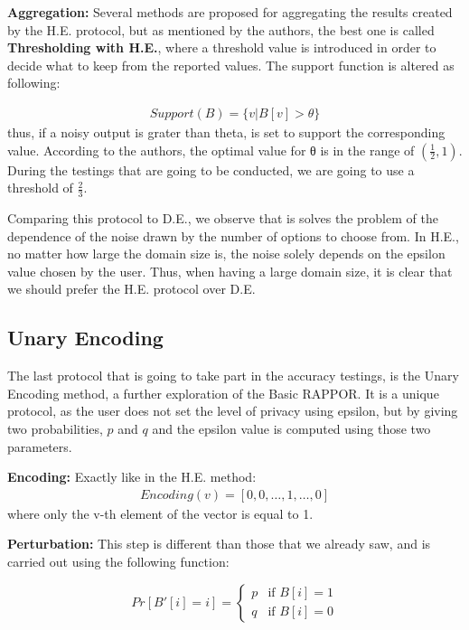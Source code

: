 \textbf{Aggregation:} Several methods are proposed for aggregating the results created by the H.E. protocol, but as mentioned by the authors, the best one is called \textbf{Thresholding with H.E.}, where a threshold value is introduced in order to decide what to keep from the reported values. The support function is altered as following:

\begin{align*}
    Support(B) = \{v | B[v] > \theta\}
\end{align*}
thus, if a noisy output is grater than theta, is set to support the corresponding value. According to the authors, the optimal value for θ is in the range of $(\frac{1}{2}, 1)$. During the testings that are going to be conducted, we are going to use a threshold of $\frac{2}{3}$.


Comparing this protocol to D.E., we observe that is solves the problem of the dependence of the noise drawn by the number of options to choose from. In H.E., no matter how large the domain size is, the noise solely depends on the epsilon value chosen by the user. Thus, when having a large domain size, it is clear that we should prefer the H.E. protocol over D.E.

\subsection{Unary Encoding}

The last protocol that is going to take part in the accuracy testings, is the Unary Encoding method, a further exploration of the Basic RAPPOR. It is a unique protocol, as the user does not set the level of privacy using epsilon, but by giving two probabilities, $p$ and $q$ and the epsilon value is computed using those two parameters.

\textbf{Encoding:} Exactly like in the H.E. method:
\begin{align*}
Encoding(v) = [0, 0, \dots, 1, \dots, 0] 
\end{align*}
where only the v-th element of the vector is equal to 1.

\textbf{Perturbation:} This step is different than those that we already saw, and is carried out using the following function:


\begin{equation*}
    Pr[B'[i] = i] =
	\begin{cases}
    	p  & \mbox{if } B[i] = 1 \\
    	q & \mbox{if } B[i] = 0 
	\end{cases}
\end{equation*}

